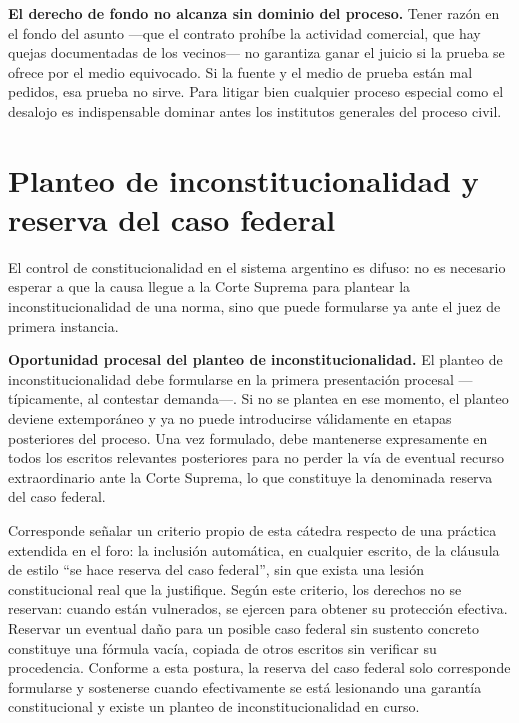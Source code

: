 \documentclass[12pt,oneside]{book}
\begin{document}
\begin{important}
\textbf{El derecho de fondo no alcanza sin dominio del proceso.} Tener razón en el fondo del asunto —que el contrato prohíbe la actividad comercial, que hay quejas documentadas de los vecinos— no garantiza ganar el juicio si la prueba se ofrece por el medio equivocado. Si la fuente y el medio de prueba están mal pedidos, esa prueba no sirve. Para litigar bien cualquier proceso especial como el desalojo es indispensable dominar antes los institutos generales del proceso civil.
\end{important}

\section{Planteo de inconstitucionalidad y reserva del caso federal}

El control de constitucionalidad en el sistema argentino es difuso: no es necesario esperar a que la causa llegue a la Corte Suprema para plantear la inconstitucionalidad de una norma, sino que puede formularse ya ante el juez de primera instancia.

\begin{important}
\textbf{Oportunidad procesal del planteo de inconstitucionalidad.} El planteo de inconstitucionalidad debe formularse en la primera presentación procesal —típicamente, al contestar demanda—. Si no se plantea en ese momento, el planteo deviene extemporáneo y ya no puede introducirse válidamente en etapas posteriores del proceso. Una vez formulado, debe mantenerse expresamente en todos los escritos relevantes posteriores para no perder la vía de eventual recurso extraordinario ante la Corte Suprema, lo que constituye la denominada reserva del caso federal.
\end{important}

Corresponde señalar un criterio propio de esta cátedra respecto de una práctica extendida en el foro: la inclusión automática, en cualquier escrito, de la cláusula de estilo ``se hace reserva del caso federal'', sin que exista una lesión constitucional real que la justifique. Según este criterio, los derechos no se reservan: cuando están vulnerados, se ejercen para obtener su protección efectiva. Reservar un eventual daño para un posible caso federal sin sustento concreto constituye una fórmula vacía, copiada de otros escritos sin verificar su procedencia. Conforme a esta postura, la reserva del caso federal solo corresponde formularse y sostenerse cuando efectivamente se está lesionando una garantía constitucional y existe un planteo de inconstitucionalidad en curso.
\end{document}
